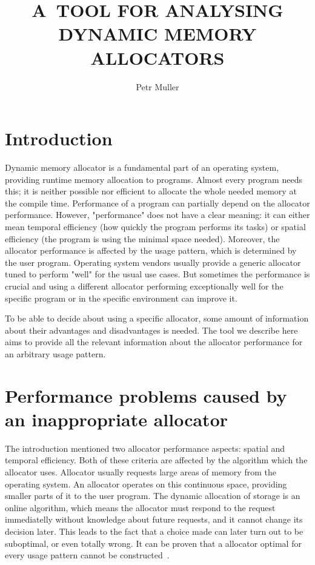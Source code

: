 \documentclass{eeict}
\title{A~TOOL FOR ANALYSING DYNAMIC MEMORY ALLOCATORS}
\author{Petr Muller}
\begin{document}

\maketitle

\section{Introduction}

Dynamic memory allocator is a fundamental part of an operating system, providing runtime memory allocation to programs. Almost every program needs this; it is neither possible nor efficient to allocate the whole needed memory at the compile time. Performance of a program can partially depend on the allocator performance. However, "performance" does not have a clear meaning: it can either mean temporal efficiency (how quickly the program performs its tasks) or spatial efficiency (the program is using the minimal space needed). Moreover, the allocator performance is affected by the usage pattern, which is determined by the user program. Operating system vendors usually provide a generic allocator tuned to perform "well" for the usual use cases. But sometimes the performance is crucial and using a different allocator performing exceptionally well for the specific program or in the specific environment can improve it.

To be able to decide about using a specific allocator, some amount of information about their advantages and disadvantages is needed. The tool we describe here aims to provide all the relevant information about the allocator performance for an arbitrary usage pattern.

\section{Performance problems caused by an inappropriate allocator}

The introduction mentioned two allocator performance aspects: spatial and temporal efficiency. Both of these criteria are affected by the algorithm which the allocator uses. Allocator usually requests large areas of memory from the operating system. An allocator operates on this continuous space, providing smaller parts of it to the user program. The dynamic allocation of storage is an online algorithm, which means the allocator must respond to the request immediatelly without knowledge about future requests, and it cannot change its decision later. This leads to the fact that a choice made can later turn out to be suboptimal, or even totally wrong. It can be proven that a allocator optimal for every usage pattern cannot be constructed~\cite{dsa}.
\end{document}

